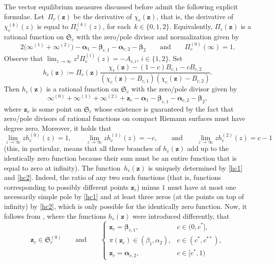 \documentclass[pdftex]{sigma}
\numberwithin{equation}{section}
\newcommand{\RS}{\boldsymbol{\mathfrak{S}}}
\newcommand{\z}	{{\boldsymbol z}}
\begin{document}
The vector equilibrium measures discussed before admit the following explicit formulae. Let~$ \Pi_c(\z) $ be the derivative of $ \chi_c(\z) $, that is, the derivative of $ \chi_c^{(k)}(z) $ is equal to $ \Pi_c^{(k)}(z) $, for each~${k\in\{0,1,2\}}$. Equivalently, $ \Pi_c(\z) $ is a rational function on $ \RS_c $ with the zero/pole divisor and normalization given by
\begin{equation}
\label{Pin}
2\bigl(\infty^{(1)} + \infty^{(2)} \bigr) - \boldsymbol\alpha_1 - \boldsymbol\beta_{c,1} - \boldsymbol\alpha_{c,2} - \boldsymbol\beta_2 \qquad \text{and}\qquad  \Pi_c^{(0)}(\infty) =1.
\end{equation}
Observe that $ \lim_{z\to\infty} z^2\Pi_c^{(i)}(z) = -A_{c,i} $, $ i\in\{1,2\} $. Set
\begin{equation}
\label{h_chi}
h_c(\z) := \Pi_c(\z) \frac{\chi_c(\z) - (1-c)B_{c,1} - c B_{c,2}}{(\chi_c(\z)-B_{c,1})(\chi_c(\z)-B_{c,2})}.
\end{equation}
Then $ h_c(\z) $ is a rational function on $ \RS_c $ with the zero/pole divisor given by
\begin{equation}
\label{hc1}
\infty^{(0)} + \infty^{(1)} + \infty^{(2)} + \z_c - \boldsymbol\alpha_1 - \boldsymbol\beta_{c,1} - \boldsymbol\alpha_{c,2} - \boldsymbol\beta_2,
\end{equation}
where $ \z_c $ is some point on $ \RS_c $ whose existence is guaranteed by the fact that zero/pole divisors of rational functions on compact Riemann surfaces must have degree zero. Moreover, it holds that
\begin{equation}
\label{hc2}
\lim_{z\to\infty} zh_c^{(0)}(z) = 1, \qquad \lim_{z\to\infty} zh_c^{(1)}(z) = -c, \qquad \text{and}\qquad  \lim_{z\to\infty} zh_c^{(2)}(z) = c-1
\end{equation}
(this, in particular, means that all three branches of $ h_c(\z) $ add up to the identically zero function because their sum must be an entire function that is equal to zero at infinity). The function~$ h_c(\z) $ is uniquely determined by \eqref{hc1} and \eqref{hc2}. Indeed, the ratio of any two such functions (that is, functions corresponding to possibly different points $ \z_c $) minus $ 1 $ must have at most one necessarily simple pole by \eqref{hc1} and at least three zeros (at the points on top of infinity) by \eqref{hc2}, which is only possible for the identically zero function. Now, it follows from \cite[Proposition~2.3]{Ya16}, where the functions $ h_c(\z) $ were introduced differently, that
\begin{equation}
\label{point_zc}
\z_c\in \RS_c^{(0)} \qquad \text{and}\qquad
\begin{cases}
\z_c=\boldsymbol\beta_{c,1}, & c\in(0,c^*], \\
\pi(\z_c) \in (\beta_1,\alpha_2), & c\in(c^*,c^{**}), \\
\z_c=\boldsymbol\alpha_{c,2}, & c\in[c^*,1)
\end{cases}
\end{equation}
\end{document}

